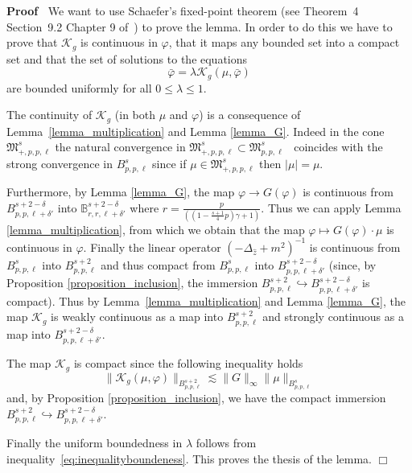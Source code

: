 \documentclass[a4paper,10pt]{article}
\newenvironment{proof}{\noindent\textbf{Proof\ }}{\hspace*{\fill}$\Box$\medskip}
\begin{document}
\begin{proof}
  We want to use Schaefer's fixed-point theorem (see Theorem~4 Section~9.2
  Chapter 9 of~{\cite{Evans1998}}) to prove the lemma. In order to do this we
  have to prove that $\mathcal{K}_g$ is continuous in $\varphi$, that it maps
  any bounded set into a compact set and that the set of solutions to the
  equations
  \[ \bar{\varphi} = \lambda \mathcal{K}_g (\mu, \bar{\varphi}) \]
  are bounded uniformly for all $0 \leqslant \lambda \leqslant 1$.
  
  The continuity of $\mathcal{K}_g$ (in both $\mu$ and $\varphi$) is a
  consequence of Lemma~\ref{lemma_multiplication} and Lemma \ref{lemma_G}.
  Indeed in the cone $\mathfrak{M}^s_{+, p, p, \ell}$ the natural convergence
  in $\mathfrak{M}^s_{+, p, p, \ell} \subset \mathfrak{M}^s_{p, p, \ell}$ \
  coincides with the strong convergence in $B^s_{p, p, \ell}$ since if $\mu
  \in \mathfrak{M}^s_{+, p, p, \ell}$ then $| \mu | = \mu$.
  
  Furthermore, by Lemma \ref{lemma_G}, the map $\varphi \rightarrow G
  (\varphi)$ is continuous from $B^{s + 2 - \delta}_{p, p, \ell + \delta'}$
  into $\mathbb{B}^{s + 2 - \delta}_{r, r, \ell + \delta'}$ where $r =
  \frac{p}{\left( \left( 1 - \frac{s + 1}{4} p \right) \gamma + 1 \right)}$.
  Thus we can apply Lemma \ref{lemma_multiplication}, from which we obtain
  that the map $\varphi \longmapsto G (\varphi) \cdot \mu$ is continuous in
  $\varphi$. Finally the linear operator $(- \Delta_{\hat{z}} + m^2)^{- 1}$ is
  continuous from $B^s_{p, p, \ell}$ into $B^{s + 2}_{p, p, \ell}$ and thus
  compact from $B^s_{p, p, \ell}$ into $B^{s + 2 - \delta}_{p, p, \ell +
  \delta'}$ (since, by Proposition \ref{proposition_inclusion}, the immersion
  $B^{s + 2}_{p, p, \ell} \hookrightarrow B^{s + 2 - \delta}_{p, p, \ell +
  \delta'}$ is compact). Thus by Lemma~\ref{lemma_multiplication} and Lemma
  \ref{lemma_G}, the map $\mathcal{K}_g$ is weakly continuous as a map into
  $B^{s + 2}_{p, p, \ell}$ and strongly continuous as a map into $B^{s + 2 -
  \delta}_{p, p, \ell + \delta'}$.
  
  The map $\mathcal{K}_g$ is compact since the following inequality holds
  \begin{equation}
    \| \mathcal{K}_g (\mu, \varphi) \|_{B^{s + 2}_{p, p, \ell}} \lesssim \| G
    \|_{\infty} \| \mu \|_{B^s_{p, p, \ell}} \label{eq:inequalityboundeness}
  \end{equation}
  and, by Proposition \ref{proposition_inclusion}, we have the compact
  immersion $B^{s + 2}_{p, p, \ell} \hookrightarrow B^{s + 2 - \delta}_{p, p,
  \ell + \delta'}$.
  
  Finally the uniform boundedness in $\lambda$ follows from
  inequality~{\eqref{eq:inequalityboundeness}}. This proves the thesis of the
  lemma.
\end{proof}
\end{document}
